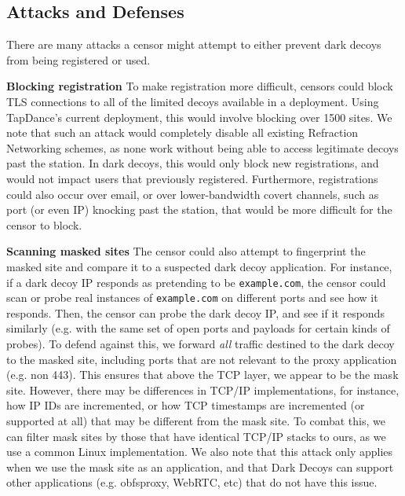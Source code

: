 \documentclass[letterpaper,twocolumn,10pt]{article}
\renewcommand{\paragraph}[1]{\smallskip\noindent\textbf{#1\quad}}
\begin{document}
\subsection{Attacks and Defenses}

There are many attacks a censor might attempt to either prevent dark decoys from
being registered or used.

\paragraph{Blocking registration}
To make registration more difficult, censors could block TLS connections to all of the
limited decoys available in a deployment. Using TapDance's current deployment,
this would involve blocking over 1500 sites. We note that such an attack would
completely disable all existing Refraction Networking schemes, as none work
without being able to access legitimate decoys past the station. In dark decoys,
this would only block new registrations, and would not impact users that
previously registered. Furthermore, registrations could also occur over email,
or over lower-bandwidth covert channels, such as port (or even IP) knocking past
the station, that would be more difficult for the censor to block.

\paragraph{Scanning masked sites}
The censor could also attempt to fingerprint the masked site and compare it to a
suspected dark decoy application. For instance, if a dark decoy IP responds as
pretending to be \texttt{example.com}, the censor could scan or probe real instances
of \texttt{example.com} on different ports and see how it responds. Then, the
censor can probe the dark decoy IP, and see if it responds similarly (e.g. with
the same set of open ports and payloads for certain kinds of probes). To defend
against this, we forward \emph{all} traffic destined to the dark decoy to the
masked site, including ports that are not relevant to the proxy application
(e.g. non 443). This ensures that above the TCP layer, we appear to be the mask
site. However, there may be differences in TCP/IP implementations, for instance,
how IP IDs are incremented, or how TCP timestamps are incremented (or supported
at all) that may be different from the mask site. To combat this, we can filter
mask sites by those that have identical TCP/IP stacks to ours, as we use a
common Linux implementation. We also note that this attack only applies when we
use the mask site as an application, and that Dark Decoys can support other
applications (e.g. obfsproxy, WebRTC, etc) that do not have this issue.
\end{document}
